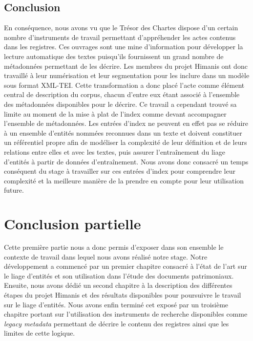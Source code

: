 \documentclass[a4paper,12pt,twoside]{book}
\begin{document}
	\section*{Conclusion}
	
	En conséquence, nous avons vu que le Trésor des Chartes dispose d'un certain nombre d'instruments de travail permettant d'appréhender les actes contenus dans les registres. Ces ouvrages sont une mine d'information pour développer la lecture automatique des textes puisqu'ils fournissent un grand nombre de métadonnées permettant de les décrire. Les membres du projet Himanis ont donc travaillé à leur numérisation et leur segmentation pour les inclure dans un modèle sous format XML-TEI. Cette transformation a donc placé l'acte comme élément central de description du corpus, chacun d'entre eux étant associé à l'ensemble des métadonnées disponibles pour le décrire. Ce travail a cependant trouvé sa limite au moment de la mise à plat de l'index comme devant accompagner l'ensemble de métadonnées. Les entrées d'index ne peuvent en effet pas se réduire à un ensemble d'entités nommées reconnues dans un texte et doivent constituer un référentiel propre afin de modéliser la complexité de leur définition et de leurs relations entre elles et avec les textes, puis assurer l'entraînement du liage d'entités à partir de données d'entraînement. Nous avons donc consacré un temps conséquent du stage à travailler sur ces entrées d'index pour comprendre leur complexité et la meilleure manière de la prendre en compte pour leur utilisation future.
	
	\chapter*{Conclusion partielle}
	
	Cette première partie nous a donc permis d'exposer dans son ensemble le contexte de travail dans lequel nous avons réalisé notre stage. Notre développement a commencé par un premier chapitre consacré à l'état de l'art sur le liage d'entités et son utilisation dans l'étude des documents patrimoniaux. Ensuite, nous avons dédié un second chapitre à la description des différentes étapes du projet Himanis et des résultats disponibles pour poursuivre le travail sur le liage d'entités. Nous avons enfin terminé cet exposé par un troisième chapitre portant sur l'utilisation des instruments de recherche disponibles comme \textit{legacy metadata} permettant de décrire le contenu des registres ainsi que les limites de cette logique.
	
\end{document}
